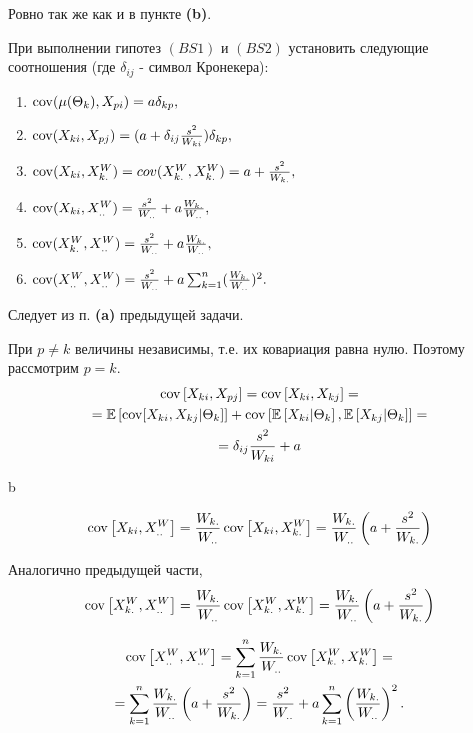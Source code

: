 \partsol{}
Ровно так же как и в пункте {\bf(b)}.


\problem{}
При выполнении гипотез $(BS1)$  и $(BS2)$  установить следующие соотношения (где $\delta_{ij}$  - символ Кронекера): 
\begin{enumerate}
\item $\operatorname*{cov}(\mu(\Theta_k),X_{pi})=a\delta_{kp},$ 
\item $\operatorname*{cov}(X_{ki},X_{pj})=(a+\delta_{ij}\frac{s^2}{W_{ki}})\delta_{kp},$ 
\item $\operatorname*{cov}(X_{ki},X_{k.}^W)=cov(X_{k.}^W,X_{k.}^W)=a+\frac{s^2}{W_{k.}},$ 
\item $\operatorname*{cov}(X_{ki},X_{..}^W)=\frac{s^2}{W_{..}}+a\frac{W_{k.}}{W_{..}},$ 
\item $\operatorname*{cov}(X_{k.}^W,X_{..}^W)=\frac{s^2}{W_{..}}+a\frac{W_{k.}}{W_{..}},$ 
\item $\operatorname*{cov}(X_{..}^W,X_{..}^W)=\frac{s^2}{W_{..}}+a\sum_{k=1}^n(\frac{W_{k.}}{W_{..}})^2.$ 
\end{enumerate}
\solution{}
\partsol{}
Следует из п. {\bf(a)} предыдущей задачи.

\partsol{}
При $p\neq k$ величины независимы, т.е. их ковариация равна нулю. Поэтому рассмотрим $p = k$.
\begin{multline}
    \operatorname*{cov}\left[X_{ki}, X_{pj}\right] =\operatorname*{cov}\left[X_{ki}, X_{kj}\right] =\\= \mathbb{E}\left[\operatorname*{cov}[X_{ki}, X_{kj}\vert \Theta_k]\right] + \operatorname*{cov}\left[\mathbb{E}\left[X_{ki}\vert \Theta_k\right], \mathbb{E}\left[X_{kj}\vert \Theta_k\right]\right] =\\=
    \delta_{ij}\frac{s^2}{W_{ki}}+a
\end{multline}

\partsol{}
 b

\partsol{}
\begin{equation}
    \operatorname*{cov}\left[X_{ki}, X_{..}^W\right] = \frac{W_{k.}}{W_{..}}\operatorname*{cov}\left[X_{ki}, X_{k.}^W\right] =   \frac{W_{k.}}{W_{..}}\left(a+\frac{s^2}{W_{k.}}\right)
\end{equation}

\partsol{}Аналогично предыдущей части,
\begin{equation}
    \operatorname*{cov}\left[X_{k.}^W, X_{..}^W\right] = \frac{W_{k.}}{W_{..}}\operatorname*{cov}\left[X_{k.}^W, X_{k.}^W\right] =   \frac{W_{k.}}{W_{..}}\left(a+\frac{s^2}{W_{k.}}\right)
\end{equation}

\partsol{}
\begin{multline}
    \operatorname*{cov}\left[X_{..}^W, X_{..}^W\right] = \sum_{k=1}^n\frac{W_{k.}}{W_{..}}\operatorname*{cov}\left[X_{k.}^W, X_{k.}^W\right] =\\= \sum_{k=1}^n\frac{W_{k.}}{W_{..}}\left(a+\frac{s^2}{W_{k.}}\right) = \frac{s^2}{W_{..}}+a\sum_{k=1}^n\left(\frac{W_{k.}}{W_{..}}\right)^2.
\end{multline}